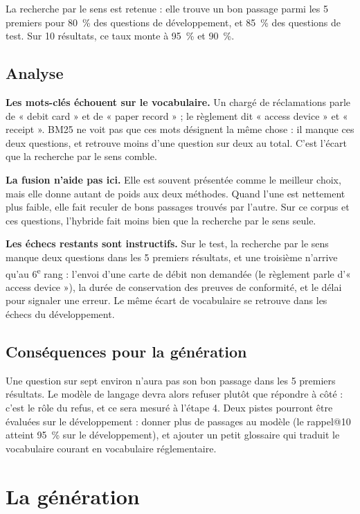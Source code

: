 \documentclass[11pt,a4paper]{article}
\begin{document}
La recherche par le sens est retenue : elle trouve un bon passage parmi les 5 premiers pour 80~\% des questions de développement, et 85~\% des questions de test. Sur 10 résultats, ce taux monte à 95~\% et 90~\%.

\subsection{Analyse}

\textbf{Les mots-clés échouent sur le vocabulaire.} Un chargé de réclamations parle de « debit card » et de « paper record » ; le règlement dit « access device » et « receipt ». BM25 ne voit pas que ces mots désignent la même chose : il manque ces deux questions, et retrouve moins d'une question sur deux au total. C'est l'écart que la recherche par le sens comble.

\textbf{La fusion n'aide pas ici.} Elle est souvent présentée comme le meilleur choix, mais elle donne autant de poids aux deux méthodes. Quand l'une est nettement plus faible, elle fait reculer de bons passages trouvés par l'autre. Sur ce corpus et ces questions, l'hybride fait moins bien que la recherche par le sens seule.

\textbf{Les échecs restants sont instructifs.} Sur le test, la recherche par le sens manque deux questions dans les 5 premiers résultats, et une troisième n'arrive qu'au 6\textsuperscript{e} rang : l'envoi d'une carte de débit non demandée (le règlement parle d'« access device »), la durée de conservation des preuves de conformité, et le délai pour signaler une erreur. Le même écart de vocabulaire se retrouve dans les échecs du développement.

\subsection{Conséquences pour la génération}

Une question sur sept environ n'aura pas son bon passage dans les 5 premiers résultats. Le modèle de langage devra alors refuser plutôt que répondre à côté : c'est le rôle du refus, et ce sera mesuré à l'étape 4. Deux pistes pourront être évaluées sur le développement : donner plus de passages au modèle (le rappel@10 atteint 95~\% sur le développement), et ajouter un petit glossaire qui traduit le vocabulaire courant en vocabulaire réglementaire.

\section{La génération}
\end{document}
